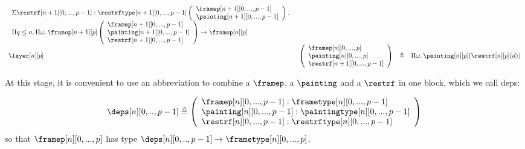 \documentclass{msc}
\newcommand{\defeq}{\ensuremath{\triangleq}}
\begin{document}
\begin{equation*}
\begin{array}{llcl}
    \begin{array}{l}
      \Sigma \restrf[n+1][0,...,p-1]
      :\restrftype[n+1][0,...,p-1]
      \left(\begin{array}{l}
                \framep[n+1][0,...,p-1]   \\
                \painting[n+1][0,...,p-1] \\
              \end{array}\right)                         .  \\
      \Pi q\leq n.\,\Pi \omega.\,\framep[n+1][p]
      \left(\begin{array}{l}
                \framep[n+1][0,...,p-1]   \\
                \painting[n+1][0,...,p-1] \\
                \restrf[n+1][0,...,p-1]   \\
              \end{array}\right) \rightarrow  \framep[n][p] \\
    \end{array} \\
    \layer[n][p]                  &
    \left(\begin{array}{l}
              \framep[n][0,...,p]     \\
              \painting[n][0,...,p]   \\
              \restrf[n+1][0,...,p-1] \\
            \end{array}\right)    & \defeq &
    \Pi\omega.\,\painting[n][p](\restrf[n][p](d))
  \end{array}
\end{equation*}

At this stage, it is convenient to use an abbreviation to combine a $\framep$, a $\painting$ and a $\restrf$ in one block, which we call deps:

\begin{align*}
  \deps[n][0,..,p-1] \defeq
  \left(\begin{array}{l}
            \framep[n][0,...,p-1] :\frametype[n][0,...,p-1]      \\
            \painting[n][0,...,p-1] :\paintingtype[n][0,...,p-1] \\
            \restrf[n][0,...,p-1]  :\restrftype[n][0,...,p-1]    \\
          \end{array}\right)
\end{align*}
so that $\framep[n][0,...,p]$ has type $\deps[n][0,..,p-1] \rightarrow \frametype[n][0,...,p]$.
\end{document}
